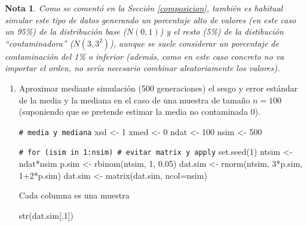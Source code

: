 \documentclass[
  10pt,
]{book}
\newenvironment{Shaded}{\begin{snugshade}}{\end{snugshade}}
\newcommand{\AttributeTok}[1]{\textcolor[rgb]{0.77,0.63,0.00}{#1}}
\newcommand{\CommentTok}[1]{\textcolor[rgb]{0.56,0.35,0.01}{\textit{#1}}}
\newcommand{\DecValTok}[1]{\textcolor[rgb]{0.00,0.00,0.81}{#1}}
\newcommand{\FloatTok}[1]{\textcolor[rgb]{0.00,0.00,0.81}{#1}}
\newcommand{\FunctionTok}[1]{\textcolor[rgb]{0.00,0.00,0.00}{#1}}
\newcommand{\NormalTok}[1]{#1}
\newcommand{\OtherTok}[1]{\textcolor[rgb]{0.56,0.35,0.01}{#1}}
\newcommand{\SpecialCharTok}[1]{\textcolor[rgb]{0.00,0.00,0.00}{#1}}
\theoremstyle{break}
\theoremstyle{nonumberplain}
\newtheorem{remark}{Nota}
\renewcommand{\CommentTok}[1]{\textcolor[rgb]{0.41,0.41,0.41}{\texttt{#1}}}
\begin{document}
\begin{remark}
Como se comentó en la Sección \ref{composicion}, también es habitual simular este tipo de datos generando un porcentaje alto de valores (en este caso un 95\%) de la distribución base (\(N(0,1)\)) y el resto (5\%) de la distibución ``contaminadora'' (\(N(3,3^2)\)), aunque se suele considerar un porcentaje de contaminación del 1\% o inferior (además, como en este caso concreto no va importar el orden, no sería necesario combinar aleatoriamente los valores).
\end{remark}

\vspace{0.5cm}

\begin{enumerate}
\def\labelenumi{\alph{enumi})}
\item
  Aproximar mediante simulación (500 generaciones) el sesgo y
  error estándar de la media y la mediana en el caso de una
  muestra de tamaño \(n=100\) (suponiendo que se pretende estimar la
  media no contaminada 0).

\begin{Shaded}
\begin{Highlighting}[]
\CommentTok{\# media y mediana}
\NormalTok{xsd }\OtherTok{\textless{}{-}} \DecValTok{1}
\NormalTok{xmed }\OtherTok{\textless{}{-}} \DecValTok{0}
\NormalTok{ndat }\OtherTok{\textless{}{-}} \DecValTok{100}
\NormalTok{nsim }\OtherTok{\textless{}{-}} \DecValTok{500}

\CommentTok{\# for (isim in 1:nsim) \# evitar matrix y apply}
\FunctionTok{set.seed}\NormalTok{(}\DecValTok{1}\NormalTok{)}
\NormalTok{ntsim }\OtherTok{\textless{}{-}}\NormalTok{ ndat}\SpecialCharTok{*}\NormalTok{nsim}
\NormalTok{p.sim }\OtherTok{\textless{}{-}} \FunctionTok{rbinom}\NormalTok{(ntsim, }\DecValTok{1}\NormalTok{, }\FloatTok{0.05}\NormalTok{)}
\NormalTok{dat.sim }\OtherTok{\textless{}{-}} \FunctionTok{rnorm}\NormalTok{(ntsim, }\DecValTok{3}\SpecialCharTok{*}\NormalTok{p.sim, }\DecValTok{1}\SpecialCharTok{+}\DecValTok{2}\SpecialCharTok{*}\NormalTok{p.sim)}
\NormalTok{dat.sim }\OtherTok{\textless{}{-}} \FunctionTok{matrix}\NormalTok{(dat.sim, }\AttributeTok{ncol=}\NormalTok{nsim)}
\end{Highlighting}
\end{Shaded}

  Cada columna es una muestra

\begin{Shaded}
\begin{Highlighting}[]
\FunctionTok{str}\NormalTok{(dat.sim[,}\DecValTok{1}\NormalTok{])}
\end{Highlighting}
\end{Shaded}


\end{enumerate}
\end{document}
